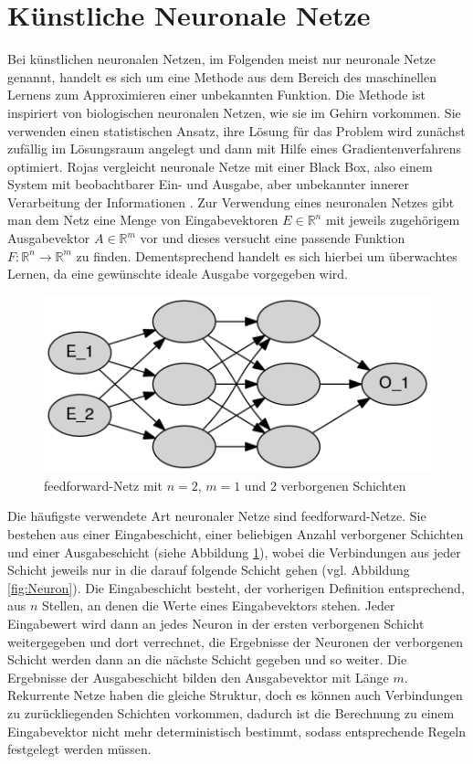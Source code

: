 \documentclass[
	twoside,
	12pt,
	a4paper,
	BCOR10mm,
	DIV14,
	listof=totoc,
	bibliography=totoc,
	headsepline
]{scrreprt}
\begin{document}
\section{Künstliche Neuronale Netze}
\label{back_nn}
Bei künstlichen neuronalen Netzen, im Folgenden meist nur neuronale Netze genannt, handelt es sich um eine Methode aus dem Bereich des maschinellen Lernens zum Approximieren einer unbekannten Funktion. Die Methode ist inspiriert von biologischen neuronalen Netzen, wie sie im Gehirn vorkommen. 
Sie verwenden einen statistischen Ansatz, ihre Lösung für das Problem wird zunächst zufällig im Lösungsraum angelegt und dann mit Hilfe eines Gradientenverfahrens optimiert.
Rojas vergleicht neuronale Netze mit einer Black Box, also einem System mit beobachtbarer Ein- und Ausgabe, aber unbekannter innerer Verarbeitung der Informationen \cite{Rojas:1996:NNS:235222}. 
Zur Verwendung eines neuronalen Netzes gibt man dem Netz eine Menge von Eingabevektoren $E \in \mathbb{R}^n$ mit jeweils zugehörigem Ausgabevektor $A \in \mathbb{R}^m$ vor und dieses versucht eine passende Funktion $F: \mathbb{R}^n \rightarrow \mathbb{R}^m$ zu finden. Dementsprechend handelt es sich hierbei um überwachtes Lernen, da eine gewünschte ideale Ausgabe vorgegeben wird.

\begin{figure}[h]
	\begin{center}
		\includegraphics[height=.20\textwidth]{Dot/netz.png}
	\end{center}
	\caption{feedforward-Netz mit $n=2$, $m=1$ und 2 verborgenen Schichten}
	\label{fig:Schichten}
\end{figure}

Die häufigste verwendete Art neuronaler Netze sind feedforward-Netze. Sie bestehen aus einer Eingabeschicht, einer beliebigen Anzahl verborgener Schichten und einer Ausgabeschicht (siehe Abbildung \ref{fig:Schichten}), wobei die Verbindungen aus jeder Schicht jeweils nur in die darauf folgende Schicht gehen (vgl. Abbildung \ref{fig:Neuron}).
Die Eingabeschicht besteht, der vorherigen Definition entsprechend, aus $n$ Stellen, an denen die Werte eines Eingabevektors stehen. Jeder Eingabewert wird dann an jedes Neuron in der ersten verborgenen Schicht weitergegeben und dort verrechnet, die Ergebnisse der Neuronen der verborgenen Schicht werden dann an die nächste Schicht gegeben und so weiter.
Die Ergebnisse der Ausgabeschicht bilden den Ausgabevektor mit Länge $m$.\\
Rekurrente Netze haben die gleiche Struktur, doch es können auch Verbindungen zu zurückliegenden Schichten vorkommen, dadurch ist die Berechnung zu einem Eingabevektor nicht mehr deterministisch bestimmt, sodass entsprechende Regeln festgelegt werden müssen.
\end{document}
